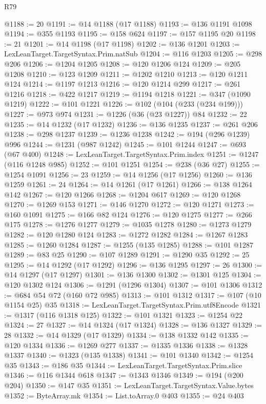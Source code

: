 \begin{lexlean}{R79}
\begin{coremodule}
@1188 := 20
@1191 := @14 @1188 (@17 @1188)
@1193 := @136 @1191 @1098
@1194 := @355 @1193
@1195 := @158 @624
@1197 := @157 @1195 @20
@1198 := 21
@1201 := @14 @1198 (@17 @1198)
@1202 := @136 @1201
@1203 := LexLeanTarget.TargetSyntax.Prim.natSub
@1204 := @116 @1203
@1205 := @298 @206
@1206 := @1204 @1205
@1208 := @120 @1206 @124
@1209 := @205 @1208
@1210 := @123 @1209
@1211 := @1202 @1210
@1213 := @120 @1211 @124
@1214 := @1197 @1213
@1216 := @120 @1214 @299
@1217 := @261 @1216
@1218 := @422 @1217
@1219 := @1194 @1218
@1221 := @347 (@1090 @1219)
@1222 := @101 @1221
@1226 := @102 (@104 (@233 (@234 @199)))
@1227 := @973 @974
@1231 := @1226 (@36 (@23 @1227)) @84
@1232 := 22
@1235 := @14 @1232 (@17 @1232)
@1236 := @136 @1235
@1237 := @261 @206
@1238 := @298 @1237
@1239 := @1236 @1238
@1242 := @194 (@296 @1239) @996
@1244 := @1231 (@987 @1242)
@1245 := @101 @1244
@1247 := @693 (@67 @400)
@1248 := LexLeanTarget.TargetSyntax.Prim.index
@1251 := @1247 (@116 @1248 @985)
@1252 := @101 @1251
@1254 := @238 (@36 @27)
@1255 := @1254 @1091
@1256 := 23
@1259 := @14 @1256 (@17 @1256)
@1260 := @136 @1259
@1261 := 24
@1264 := @14 @1261 (@17 @1261)
@1266 := @138 @1264 @142
@1267 := @120 @1266
@1268 := @1204 @617
@1269 := @120 @1268
@1270 := @1269 @153
@1271 := @146 @1270
@1272 := @120 @1271
@1273 := @160 @1091
@1275 := @166 @82 @124
@1276 := @120 @1275
@1277 := @266 @175
@1278 := @1276 @1277
@1279 := @1035 @1278
@1280 := @1273 @1279
@1282 := @120 @1280 @124
@1283 := @1272 @1282
@1284 := @1267 @1283
@1285 := @1260 @1284
@1287 := @1255 (@135 @1285)
@1288 := @101 @1287
@1289 := @83 @25
@1290 := @107 @1289
@1291 := @1290 @35
@1292 := 25
@1295 := @14 @1292 (@17 @1292)
@1296 := @136 @1295
@1297 := 26
@1300 := @14 @1297 (@17 @1297)
@1301 := @136 @1300
@1302 := @1301 @125
@1304 := @120 @1302 @124
@1306 := @1291 (@1296 @1304)
@1307 := @101 @1306
@1312 := @684 @54 @72 (@160 @72 @985)
@1313 := @101 @1312
@1317 := @107 (@10 @1154 @25) @35
@1318 := LexLeanTarget.TargetSyntax.Prim.utf8Encode
@1321 := @1317 (@116 @1318 @125)
@1322 := @101 @1321
@1323 := @1254 @22
@1324 := 27
@1327 := @14 @1324 (@17 @1324)
@1328 := @136 @1327
@1329 := 28
@1332 := @14 @1329 (@17 @1329)
@1334 := @138 @1332 @142
@1335 := @120 @1334
@1336 := @1269 @277
@1337 := @1335 @1336
@1338 := @1328 @1337
@1340 := @1323 (@135 @1338)
@1341 := @101 @1340
@1342 := @1254 @35
@1343 := @186 @35
@1344 := LexLeanTarget.TargetSyntax.Prim.slice
@1346 := @116 @1344 @618
@1347 := @1343 @1346
@1349 := @194 (@200 @204)
@1350 := @147 @35
@1351 := LexLeanTarget.TargetSyntax.Value.bytes
@1352 := ByteArray.mk
@1354 := List.toArray.{0} @403
@1355 := @24 @403

\end{coremodule}
\end{lexlean}
